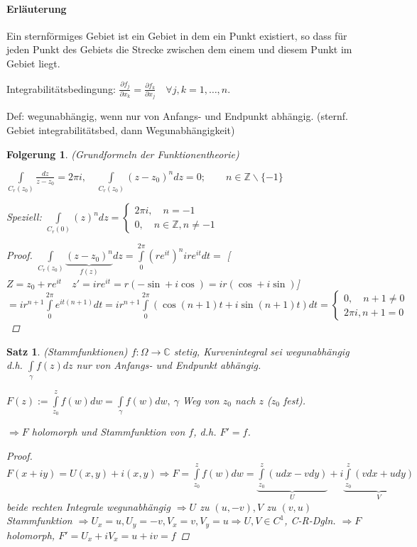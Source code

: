 \documentclass[ngerman,halfparskip]{scrartcl}
\newtheorem{satz}{Satz}[section]
\newtheorem{folg}{Folgerung}[section]
\theoremstyle{definition}
\def\C{\mathbb C}
\begin{document}
\paragraph*{Erläuterung} Ein sternförmiges Gebiet ist ein Gebiet in dem ein Punkt existiert, so dass für jeden Punkt des Gebiets die Strecke zwischen dem einem und diesem Punkt im Gebiet liegt. 

Integrabilitätsbedingung: $\frac{\partial f_j}{\partial x_k}=\frac{\partial f_k}{\partial x_j} \quad \forall j,k=1,\ldots, n$. 

Def: wegunabhängig, wenn nur von Anfangs- und Endpunkt abhängig. (sternf. Gebiet integrabilitätsbed, dann Wegunabhängigkeit)

\begin{folg} (Grundformeln der Funktionentheorie) 

$\int\limits_{C_r(z_0)}\frac{dz}{z-z_0}=2\pi i, \quad \int\limits_{C_r(z_0)}(z-z_0)^ndz=0; \qquad n\in\mathbb Z \backslash \{-1\}$

Speziell: $\int\limits_{C_r(0)}(z)^ndz=\begin{cases}2\pi i, \quad n=-1 \\ 0, \quad n\in \mathbb Z, n\neq -1\end{cases}$

\begin{proof}
$\int\limits_{C_r(z_0)}\underbrace{(z-z_0)^n}_{f(z)}dz=\int\limits_0^{2\pi}(re^{it})^nire^{it}dt=$
[$Z=z_0+re^{it} \quad z'=ire^{it}=r(-\sin + i\cos)=ir(\cos +i\sin)$]
$=ir^{n+1} \int\limits_0^{2\pi}e^{it(n+1)}dt=ir^{n+1}\int\limits_0^{2\pi}(\cos(n+1)t+i\sin(n+1)t)dt=\begin{cases}
0, \quad n+1\neq 0\\
2\pi i, n+1=0
\end{cases}$  
\end{proof}
\end{folg}

\begin{satz}(Stammfunktionen)
$f:\Omega\rightarrow \C$ stetig, Kurvenintegral sei wegunabhängig d.h. $\int\limits_\gamma f(z)dz$ nur von Anfangs- und Endpunkt abhängig.

$F(z):=\int\limits_{z_0}^z f(w)dw=\int\limits_\gamma f(w)dw, ~ \gamma$ Weg von $z_0$ nach $z$ ($z_0$ fest).

$\Rightarrow F$ holomorph und Stammfunktion von $f$, d.h. $F'=f$.
\begin{proof}
$F(x+iy)=U(x,y)+i(x,y) \Rightarrow F=\int\limits_{z_0}^z f(w)dw=\underbrace{\int\limits_{z_0}^z (udx-vdy)}_U+i\underbrace{\int\limits_{z_0}^z (vdx+udy)}_V$ beide rechten Integrale wegunabhängig $\Rightarrow U$ zu $(u,-v), V$ zu $(v,u)$ Stammfunktion $\Rightarrow U_x=u, U_y=-v, V_x=v,V_y=u \Rightarrow U,V\in C^1$, C-R-Dgln. $\Rightarrow F$ holomorph, $F'=U_x+iV_x=u+iv=f$
\end{proof}
\end{satz}
\end{document}
